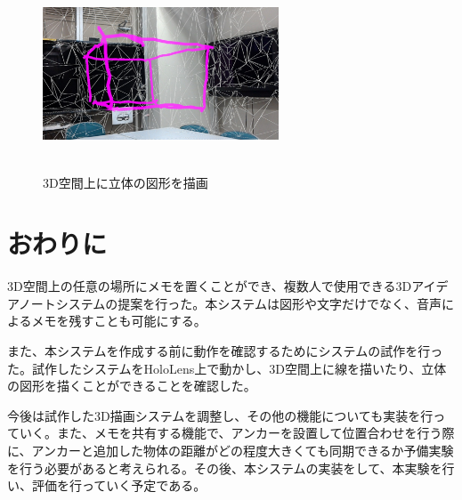 \documentclass{hissymp}
\begin{document}
\begin{figure}[h]
  \begin{center}
    \includegraphics[clip,height=5.0cm,width=7.0cm]{./rittai.eps}
    \caption{3D空間上に立体の図形を描画}
    \label{fig:rittai}
  \end{center}
\end{figure}

\section{おわりに}
3D空間上の任意の場所にメモを置くことができ、複数人で使用できる3Dアイデアノートシステムの提案を行った。本システムは図形や文字だけでなく、音声によるメモを残すことも可能にする。

また、本システムを作成する前に動作を確認するためにシステムの試作を行った。試作したシステムをHoloLens上で動かし、3D空間上に線を描いたり、立体の図形を描くことができることを確認した。

今後は試作した3D描画システムを調整し、その他の機能についても実装を行っていく。また、メモを共有する機能で、アンカーを設置して位置合わせを行う際に、アンカーと追加した物体の距離がどの程度大きくても同期できるか予備実験を行う必要があると考えられる。その後、本システムの実装をして、本実験を行い、評価を行っていく予定である。
\end{document}
